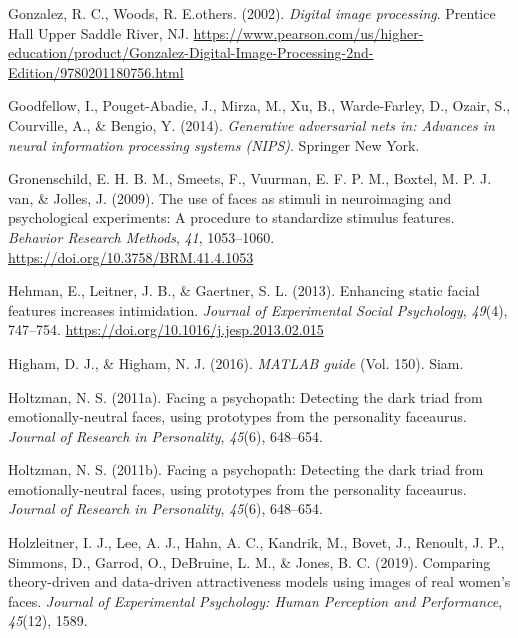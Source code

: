 \documentclass[
  doc,floatsintext]{apa6}
\newlength{\cslhangindent}
\newlength{\cslentryspacingunit} %
\newenvironment{CSLReferences}[2] %
 {%
  \setlength{\parindent}{0pt}
  \ifodd #1
  \let\oldpar\par
  \def\par{\hangindent=\cslhangindent\oldpar}
  \fi
  \setlength{\parskip}{#2\cslentryspacingunit}
 }%
 {}
\begin{document}
\begin{CSLReferences}{1}{0}
\leavevmode{}%
Gonzalez, R. C., Woods, R. E.others. (2002). \emph{Digital image processing}. Prentice Hall Upper Saddle River, NJ. \url{https://www.pearson.com/us/higher-education/product/Gonzalez-Digital-Image-Processing-2nd-Edition/9780201180756.html}

\leavevmode{}%
Goodfellow, I., Pouget-Abadie, J., Mirza, M., Xu, B., Warde-Farley, D., Ozair, S., Courville, A., \& Bengio, Y. (2014). \emph{Generative adversarial nets in: Advances in neural information processing systems (NIPS)}. Springer New York.

\leavevmode{}%
Gronenschild, E. H. B. M., Smeets, F., Vuurman, E. F. P. M., Boxtel, M. P. J. van, \& Jolles, J. (2009). The use of faces as stimuli in neuroimaging and psychological experiments: A procedure to standardize stimulus features. \emph{Behavior Research Methods}, \emph{41}, 1053--1060. \url{https://doi.org/10.3758/BRM.41.4.1053}

\leavevmode{}%
Hehman, E., Leitner, J. B., \& Gaertner, S. L. (2013). Enhancing static facial features increases intimidation. \emph{Journal of Experimental Social Psychology}, \emph{49}(4), 747--754. \url{https://doi.org/10.1016/j.jesp.2013.02.015}

\leavevmode{}%
Higham, D. J., \& Higham, N. J. (2016). \emph{MATLAB guide} (Vol. 150). Siam.

\leavevmode{}%
Holtzman, N. S. (2011a). Facing a psychopath: Detecting the dark triad from emotionally-neutral faces, using prototypes from the personality faceaurus. \emph{Journal of Research in Personality}, \emph{45}(6), 648--654.

\leavevmode{}%
Holtzman, N. S. (2011b). Facing a psychopath: Detecting the dark triad from emotionally-neutral faces, using prototypes from the personality faceaurus. \emph{Journal of Research in Personality}, \emph{45}(6), 648--654.

\leavevmode{}%
Holzleitner, I. J., Lee, A. J., Hahn, A. C., Kandrik, M., Bovet, J., Renoult, J. P., Simmons, D., Garrod, O., DeBruine, L. M., \& Jones, B. C. (2019). Comparing theory-driven and data-driven attractiveness models using images of real women's faces. \emph{Journal of Experimental Psychology: Human Perception and Performance}, \emph{45}(12), 1589.


\end{CSLReferences}
\end{document}

